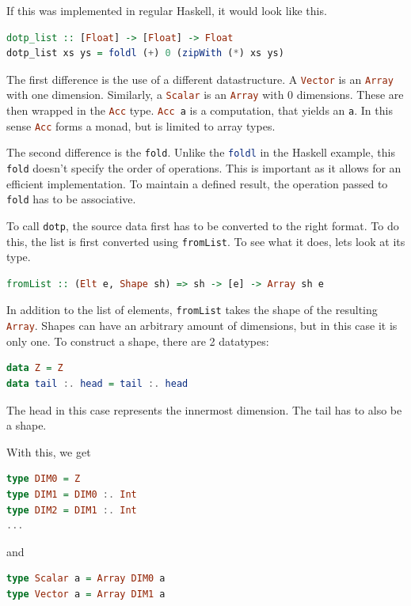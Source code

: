 \documentclass[a4paper,bibliography=totocnumbered,parskip,headsepline]{scrbook}
\begin{document}
If this was implemented in regular Haskell, it would look like this.

\begin{lstlisting}[language=haskell]
dotp_list :: [Float] -> [Float] -> Float
dotp_list xs ys = foldl (+) 0 (zipWith (*) xs ys)
\end{lstlisting}

The first difference is the use of a different datastructure.
A \lstinline[language=haskell]!Vector! is an \lstinline[language=haskell]!Array! with one dimension.
Similarly, a \lstinline[language=haskell]!Scalar! is an \lstinline[language=haskell]!Array! with 0 dimensions.
These are then wrapped in the \lstinline[language=haskell]!Acc! type.
\lstinline[language=haskell]!Acc a! is a computation, that yields an \lstinline[language=haskell]!a!.
In this sense \lstinline[language=haskell]!Acc! forms a monad, but is limited to array types.

The second difference is the \lstinline[language=haskell]!fold!.
Unlike the \lstinline[language=haskell]!foldl! in the Haskell example, this \lstinline[language=haskell]!fold! doesn't specify the order of operations.
This is important as it allows for an efficient implementation.
To maintain a defined result, the operation passed to \lstinline[language=haskell]!fold! has to be associative.

To call \lstinline[language=haskell]!dotp!, the source data first has to be converted to the right format.
To do this, the list is first converted using \lstinline[language=haskell]!fromList!.
To see what it does, lets look at its type.

\begin{lstlisting}[language=haskell]
fromList :: (Elt e, Shape sh) => sh -> [e] -> Array sh e
\end{lstlisting}

In addition to the list of elements, \lstinline[language=haskell]!fromList! takes the shape of the resulting \lstinline[language=haskell]!Array!.
Shapes can have an arbitrary amount of dimensions, but in this case it is only one.
To construct a shape, there are 2 datatypes:

\begin{lstlisting}[language=haskell]
data Z = Z
data tail :. head = tail :. head
\end{lstlisting}

The head in this case represents the innermost dimension.
The tail has to also be a shape.

With this, we get
\begin{lstlisting}[language=haskell]
type DIM0 = Z
type DIM1 = DIM0 :. Int
type DIM2 = DIM1 :. Int
...
\end{lstlisting}
and
\begin{lstlisting}[language=haskell]
type Scalar a = Array DIM0 a
type Vector a = Array DIM1 a
\end{lstlisting}
\end{document}
